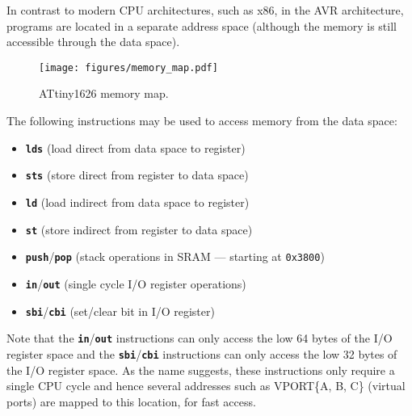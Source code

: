 \documentclass[a4paper]{report}
\newcommand{\keywordinline}[1]{\textcolor[rgb]{0.00,0.50,0.00}{\textbf{\texttt{#1}}}}
\begin{document}
In contrast to modern CPU architectures, such as x86, in the AVR
architecture, programs are located in a separate address space
(although the memory is still accessible through the data space).
\begin{figure}[H]
    \centering
    \texttt{[image: figures/memory\_map.pdf]}
    \caption{ATtiny1626 memory map.} %
\end{figure}
The following instructions may be used to access memory from the data space:
\begin{itemize}
    \item \keywordinline{lds} (load direct from data space to register)
    \item \keywordinline{sts} (store direct from register to data space)
    \item \keywordinline{ld} (load indirect from data space to register)
    \item \keywordinline{st} (store indirect from register to data space)
    \item \keywordinline{push}/\keywordinline{pop} (stack operations in SRAM --- starting at \texttt{0x3800}) %
    \item \keywordinline{in}/\keywordinline{out} (single cycle I/O register operations)
    \item \keywordinline{sbi}/\keywordinline{cbi} (set/clear bit in I/O register)
\end{itemize}
Note that the \keywordinline{in}/\keywordinline{out} instructions can
only access the low 64 bytes of the I/O register space and the \keywordinline{sbi}/\keywordinline{cbi}
instructions can only access the low 32 bytes of the I/O register space.
As the name suggests, these instructions only require a single CPU cycle and hence
several addresses such as VPORT\{A, B, C\} (virtual ports) are mapped to this location,
for fast access.
\end{document}
